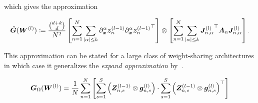 which gives the approximation 
\begin{tcolorbox}[colframe=kfac, title={KFAC with general PDE terms},bottom=0mm,top=0mm,middle=0mm]
\begin{align*}\label{eq:KFAC-PINNs-general}
    \hat{\mG}%
    (\mW^{(l)})
    \coloneqq \frac{\binom{d+k}{d}}{N^2}
    \left[\sum_{n=1}^N \sum_{\lvert \alpha \rvert \le k} %
    \partial_\vx^\alpha \vz_n^{(l-1)} {\partial_\vx^\alpha \vz_n^{(l-1)}}^\top\right] 
    \otimes
    \left[\sum_{n=1}^N\sum_{\lvert \alpha \rvert \le k} {\mJ^{(l)}_{n,\alpha}}^\top \mA_n {\mJ^{(l)}_{n,\alpha}} \right]. 
\end{align*}
\end{tcolorbox}


This approximation can be stated for a large class of weight-sharing architectures in which case it generalizes the \emph{expand approximation} by~\citet{eschenhagen2023kroneckerfactored}. 




\begin{equation*}
    {\bm{G}}_\Omega({\bm{W}}^{(l)})
    =
    \frac1N\sum_{n=1}^N
    \left[\sum_{s=1}^S \left( {\bm{Z}}^{(l-1)}_{n,s}\otimes {\bm{g}}_{n,s}^{(l)} \right)
    \cdot
    \sum_{s=1}^S \left( {\bm{Z}}
    ^{(l-1)}_{n,s}\otimes {\bm{g}}_{n,s}^{(l)} \right)^\top\right]
\end{equation*}

%

